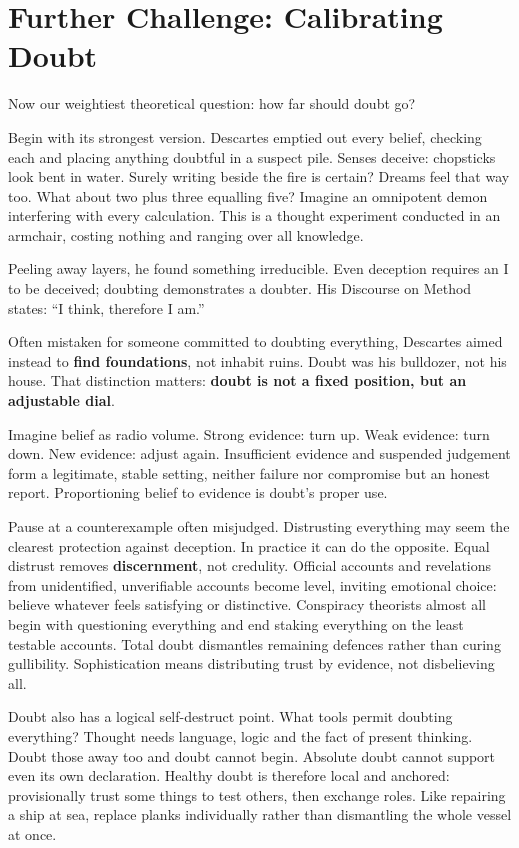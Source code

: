 \section{Further Challenge: Calibrating Doubt}
Now our weightiest theoretical question: how far should doubt go?

Begin with its strongest version. Descartes emptied out every belief, checking each and placing anything doubtful in a suspect pile. Senses deceive: chopsticks look bent in water. Surely writing beside the fire is certain? Dreams feel that way too. What about two plus three equalling five? Imagine an omnipotent demon interfering with every calculation. This is a thought experiment conducted in an armchair, costing nothing and ranging over all knowledge.

Peeling away layers, he found something irreducible. Even deception requires an I to be deceived; doubting demonstrates a doubter. His Discourse on Method states: ``I think, therefore I am.''

Often mistaken for someone committed to doubting everything, Descartes aimed instead to \textbf{find foundations}, not inhabit ruins. Doubt was his bulldozer, not his house. That distinction matters: \textbf{doubt is not a fixed position, but an adjustable dial}.

Imagine belief as radio volume. Strong evidence: turn up. Weak evidence: turn down. New evidence: adjust again. Insufficient evidence and suspended judgement form a legitimate, stable setting, neither failure nor compromise but an honest report. Proportioning belief to evidence is doubt's proper use.

Pause at a counterexample often misjudged. Distrusting everything may seem the clearest protection against deception. In practice it can do the opposite. Equal distrust removes \textbf{discernment}, not credulity. Official accounts and revelations from unidentified, unverifiable accounts become level, inviting emotional choice: believe whatever feels satisfying or distinctive. Conspiracy theorists almost all begin with questioning everything and end staking everything on the least testable accounts. Total doubt dismantles remaining defences rather than curing gullibility. Sophistication means distributing trust by evidence, not disbelieving all.

Doubt also has a logical self-destruct point. What tools permit doubting everything? Thought needs language, logic and the fact of present thinking. Doubt those away too and doubt cannot begin. Absolute doubt cannot support even its own declaration. Healthy doubt is therefore local and anchored: provisionally trust some things to test others, then exchange roles. Like repairing a ship at sea, replace planks individually rather than dismantling the whole vessel at once.

